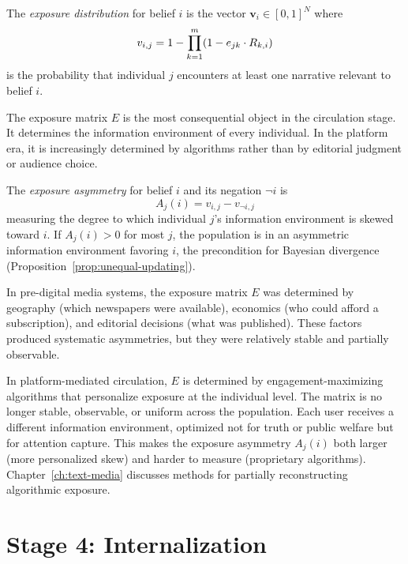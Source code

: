\begin{definition}
\label{def:exposure}
The \emph{exposure distribution} for belief $i$ is the vector $\bm{v}_i \in [0,1]^N$ where
\[
  v_{i,j} = 1 - \prod_{k=1}^{m} (1 - e_{jk} \cdot R_{k,i})
\]
is the probability that individual $j$ encounters at least one narrative relevant to belief $i$.
\end{definition}

The exposure matrix $E$ is the most consequential object in the circulation stage.
It determines the information environment of every individual. In the platform era, it is increasingly determined by algorithms rather than by editorial judgment or audience choice.

\begin{definition}
\label{def:exposure-asymmetry}
The \emph{exposure asymmetry} for belief $i$ and its negation $\neg i$ is
\[
  A_j(i) = v_{i,j} - v_{\neg i, j}
\]
measuring the degree to which individual $j$'s information environment is skewed toward $i$.
If $A_j(i) > 0$ for most $j$, the population is in an asymmetric information environment favoring $i$, the precondition for Bayesian divergence (Proposition~\ref{prop:unequal-updating}).
\end{definition}

\begin{remark}
\label{rem:algorithmic}
In pre-digital media systems, the exposure matrix $E$ was determined by geography (which newspapers were available), economics (who could afford a subscription), and editorial decisions (what was published).
These factors produced systematic asymmetries, but they were relatively stable and partially observable.

In platform-mediated circulation, $E$ is determined by engagement-maximizing algorithms that personalize exposure at the individual level.
The matrix is no longer stable, observable, or uniform across the population.
Each user receives a different information environment, optimized not for truth or public welfare but for attention capture.
This makes the exposure asymmetry $A_j(i)$ both larger (more personalized skew) and harder to measure (proprietary algorithms).
Chapter~\ref{ch:text-media} discusses methods for partially reconstructing algorithmic exposure.
\end{remark}


\section{Stage 4: Internalization}
\label{sec:ch5-internalization}

